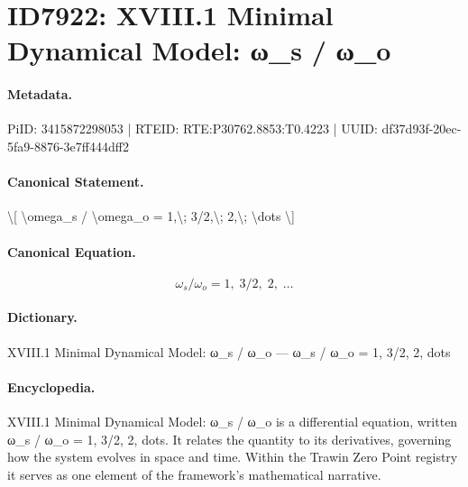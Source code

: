 \section*{ID7922: XVIII.1 Minimal Dynamical Model: ω\_s / ω\_o}
\paragraph{Metadata.}
PiID: 3415872298053 | RTEID: RTE:P30762.8853:T0.4223 | UUID: df37d93f-20ec-5fa9-8876-3e7ff444dff2

\paragraph{Canonical Statement.}
\textbackslash{}[ \textbackslash{}omega\_s / \textbackslash{}omega\_o = 1,\textbackslash{}; 3/2,\textbackslash{}; 2,\textbackslash{}; \textbackslash{}dots \textbackslash{}]

\paragraph{Canonical Equation.}
\[
\omega_s / \omega_o = 1,\; 3/2,\; 2,\; \dots
\]

\paragraph{Dictionary.}
XVIII.1 Minimal Dynamical Model: ω\_s / ω\_o — ω\_s / ω\_o = 1, 3/2, 2, dots

\paragraph{Encyclopedia.}
XVIII.1 Minimal Dynamical Model: ω\_s / ω\_o is a differential equation, written ω\_s / ω\_o = 1, 3/2, 2, dots. It relates the quantity to its derivatives, governing how the system evolves in space and time. Within the Trawin Zero Point registry it serves as one element of the framework's mathematical narrative.
